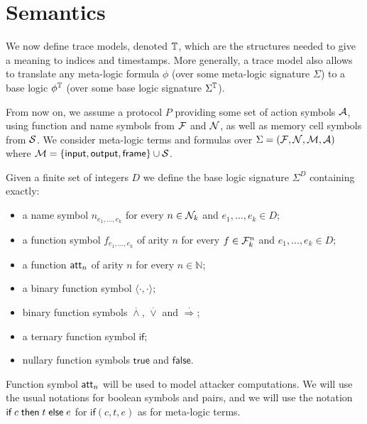 \section{Semantics}

We now define trace models, denoted $\mathbb{T}$, which are the structures needed to
give a meaning to indices and timestamps. More generally, a trace model
also allows to translate any meta-logic formula $\phi$
(over some meta-logic signature $\Sigma$)
to a base logic $\phi^{\mathbb{T}}$ (over some base logic signature $\Sigma^{\mathbb{T}}$).

\medskip

From now on, we assume a protocol $P$ providing some set of action
symbols $\mathcal{A}$, using function and name symbols from $\mathcal{F}$ and $\mathcal{N}$,
as well as memory cell symbols from $\mathcal{S}$.
We consider meta-logic terms and formulas over $\Sigma = (\mathcal{F},\mathcal{N},\mathcal{M},\mathcal{A})$
where $\mathcal{M} = \{ \textsf{input}, \textsf{output}, \textsf{frame} \} \cup \mathcal{S}$.

\begin{definition}
  Given a finite set of integers $D$ we define the base logic
  signature $\Sigma^D$ containing exactly:
  \begin{itemize}
    \item a name symbol $n_{e_1,\ldots,e_k}$ for every $n \in \mathcal{N}_k$
       and $e_1,\ldots,e_k \in D$;
    \item a function symbol $f_{e_1,\ldots,e_k}$ of arity $n$ for every
      $f \in \mathcal{F}_k^n$ and $e_1,\ldots,e_k \in D$;
    \item a function $\mathsf{att}_n$ of arity $n$ for every $n\in\mathbb{N}$;
    \item a binary function symbol $\langle \cdot , \cdot \rangle$;
    \item binary function symbols
      $\stackrel{.}{\wedge}$, $\stackrel{.}{\vee}$ and
      $\stackrel{.}{\Rightarrow}$;
    \item a ternary function symbol $\mathsf{if}$;
    \item nullary function symbols $\mathsf{true}$ and $\mathsf{false}$.
  \end{itemize}
  Function symbol $\mathsf{att}_n$ will be used to model attacker computations.
  We will use the usual notations for boolean symbols and pairs,
  and we will use the notation $\textsf{if}\; c \;\textsf{then}\; t \;\textsf{else}\; e$
  for $\mathsf{if}(c,t,e)$ as for meta-logic terms.
\end{definition}

